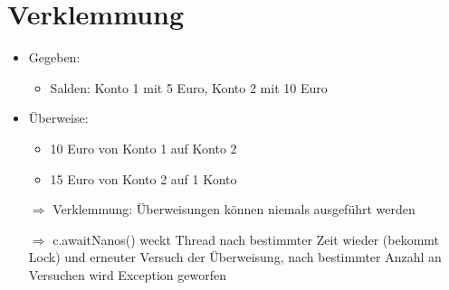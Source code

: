 \documentclass{beamer} %
\begin{document}
\section{Verklemmung}
\begin{frame}


\begin{itemize}
\item Gegeben:
\begin{itemize}
	\item Salden: Konto 1 mit 5 Euro, Konto 2 mit 10 Euro
\end{itemize}
\item Überweise:
\begin{itemize}
\item 10 Euro von Konto 1 auf Konto 2
\item 15 Euro von Konto 2 auf 1 Konto
\end{itemize}
\item[$\Rightarrow$] Verklemmung: Überweisungen können niemals ausgeführt werden
\item[$\Rightarrow$] c.awaitNanos() weckt Thread nach bestimmter Zeit wieder (bekommt Lock) und erneuter Versuch der Überweisung, nach bestimmter Anzahl an Versuchen wird Exception geworfen
\end{itemize}
\end{frame}
\end{document}
